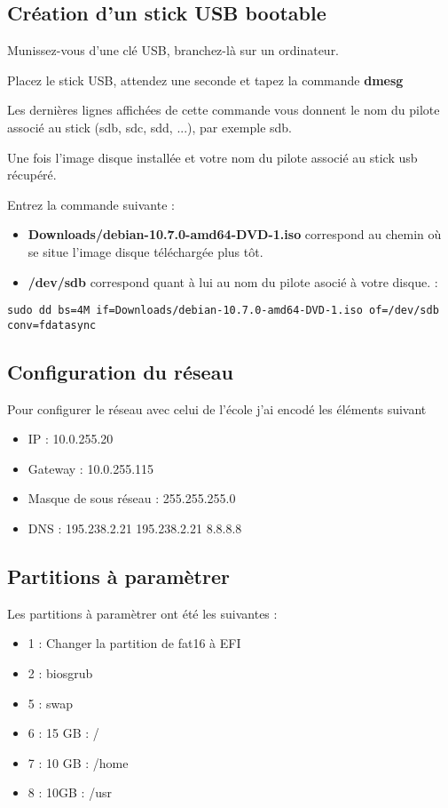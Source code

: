 \documentclass[a4paper, 12pt]{article}
\begin{document}
\begin{flushleft}
       \subsection{Création d'un stick USB bootable}
       \item Munissez-vous d'une clé USB, branchez-là sur un ordinateur.
       \item Placez le stick USB, attendez une seconde et tapez la commande \textbf{dmesg}
       \item Les dernières lignes affichées de cette commande vous donnent le nom du pilote associé au stick (sdb,
sdc, sdd, ...), par exemple sdb.
        \item Une fois l'image disque installée et votre nom du pilote associé au stick usb récupéré. 
        \item Entrez la commande suivante : 
        \begin{itemize}
            \item \textbf{Downloads/debian-10.7.0-amd64-DVD-1.iso} correspond au chemin où se situe l'image disque téléchargée plus tôt. 
            \item \textbf{/dev/sdb} correspond quant à lui au nom du pilote asocié à votre disque. : 
        \end{itemize}
        \begin{lstlisting}
sudo dd bs=4M if=Downloads/debian-10.7.0-amd64-DVD-1.iso of=/dev/sdb conv=fdatasync
        \end{lstlisting}
        

       \subsection{Configuration du réseau}
       \item Pour configurer le réseau avec celui de l'école j'ai encodé les éléments suivant
       \begin{itemize}
           \item IP : 10.0.255.20
           \item Gateway : 10.0.255.115
           \item Masque de sous réseau : 255.255.255.0
           \item DNS : 195.238.2.21 195.238.2.21 8.8.8.8
       \end{itemize}
       \subsection{Partitions à paramètrer}
       \item Les partitions à paramètrer ont été les suivantes : 
       \begin{itemize}
           \item 1 : Changer la partition de fat16 à EFI
           \item 2 : biosgrub
           \item 5 : swap
           \item 6 : 15 GB : / 
           \item 7 : 10 GB : /home
           \item 8 : 10GB : /usr 
       \end{itemize}

\end{flushleft}
\end{document}
